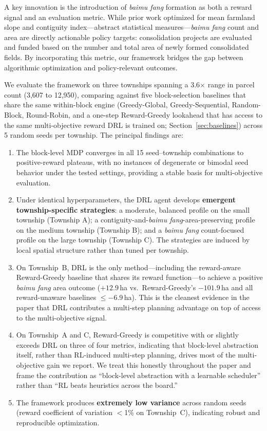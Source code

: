 \documentclass[preprint,12pt]{elsarticle}
\begin{document}
A key innovation is the introduction of \textit{baimu fang} formation as both a reward signal and an evaluation metric. While prior work optimized for mean farmland slope and contiguity index---abstract statistical measures---\textit{baimu fang} count and area are directly actionable policy targets: consolidation projects are evaluated and funded based on the number and total area of newly formed consolidated fields. By incorporating this metric, our framework bridges the gap between algorithmic optimization and policy-relevant outcomes.

We evaluate the framework on three townships spanning a 3.6$\times$ range in parcel count (3{,}607 to 12{,}950), comparing against five block-selection baselines that share the same within-block engine (Greedy-Global, Greedy-Sequential, Random-Block, Round-Robin, and a one-step Reward-Greedy lookahead that has access to the same multi-objective reward DRL is trained on; Section~\ref{sec:baselines}) across 5 random seeds per township. The principal findings are:

\begin{enumerate}
\item The block-level MDP converges in all 15 seed--township combinations to positive-reward plateaus, with no instances of degenerate or bimodal seed behavior under the tested settings, providing a stable basis for multi-objective evaluation.

\item Under identical hyperparameters, the DRL agent develops \textbf{emergent township-specific strategies}: a moderate, balanced profile on the small township (Township A); a contiguity-and-\textit{baimu fang}-area-preserving profile on the medium township (Township B); and a \textit{baimu fang} count-focused profile on the large township (Township C). The strategies are induced by local spatial structure rather than tuned per township.

\item On Township~B, DRL is the only method---including the reward-aware Reward-Greedy baseline that shares its reward function---to achieve a positive \textit{baimu fang} area outcome ($+12.9$\,ha vs.\ Reward-Greedy's $-101.9$\,ha and all reward-unaware baselines $\le -6.9$\,ha). This is the cleanest evidence in the paper that DRL contributes a multi-step planning advantage on top of access to the multi-objective signal.

\item On Township~A and C, Reward-Greedy is competitive with or slightly exceeds DRL on three of four metrics, indicating that block-level abstraction itself, rather than RL-induced multi-step planning, drives most of the multi-objective gain we report. We treat this honestly throughout the paper and frame the contribution as ``block-level abstraction with a learnable scheduler'' rather than ``RL beats heuristics across the board.''

\item The framework produces \textbf{extremely low variance} across random seeds (reward coefficient of variation $<$1\% on Township~C), indicating robust and reproducible optimization.
\end{enumerate}
\end{document}
